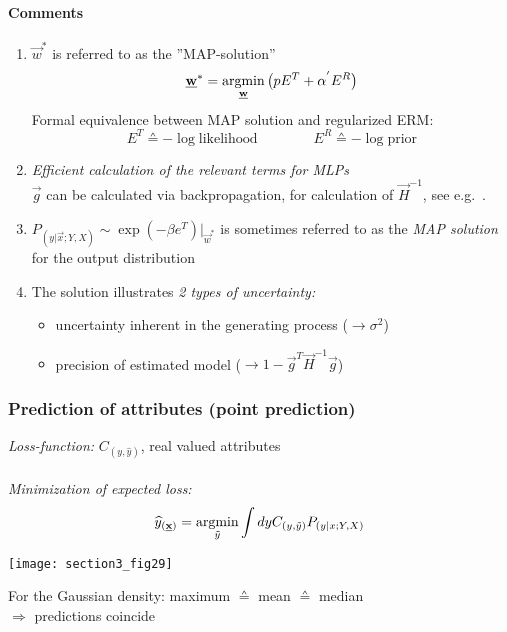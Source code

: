 \paragraph{Comments} 
\begin{enumerate}[(1)]
\item $\vec{w}^*$ is referred to as the ''MAP-solution'' \\
\begin{equation}
	\vec{w}^* = \argmin\limits_{\vec{w}} \big( p E^T + \alpha^{'} E^R \big)
\end{equation}
Formal equivalence between MAP solution and regularized ERM:
\begin{equation}
	E^T  \corresponds- \log \mathrm{likelihood} \qquad \qquad
	E^R  \corresponds - \log \mathrm{prior}
\end{equation}
\item \emph{Efficient calculation of the relevant terms for MLPs}\\
  $\vec{g}$ can be calculated via backpropagation, for calculation of
  $\vec{H}^{-1}$, see e.g.\ \textcite[ch.\ 5.4]{Bishop2006}.
\item $P_{(y|\vec{x};Y,X)} \sim \exp (-\beta e^T) \big|_{\vec{w}^*}$
  is sometimes referred to as the \emph{MAP solution} for the output
  distribution

\item The solution illustrates \emph{2 types of uncertainty:} 
  \begin{itemize}
  \item uncertainty inherent in the generating process ($\rightarrow \sigma^2$)
  \item precision of estimated model ($\rightarrow 1 - \vec{g}^T \vec{H}^{-1} \vec{g}$)
  \end{itemize}
\end{enumerate}

\subsubsection{Prediction of attributes (point prediction)}
\emph{Loss-function:} $C_{(y, \widehat{y})}$, real valued attributes
\\\\
\emph{Minimization of expected loss:}
\begin{equation}
	\widehat{y}_{(\vec{x})} = \argmin\limits_{\tilde{y}}
	\int dy C_{(y, \tilde{y})} P_{(y|x;Y,X)}
\end{equation}
\begin{center}
\texttt{[image: section3\_fig29]} 
\end{center}
For the Gaussian density: maximum $\corresponds$ mean $\corresponds$ median\\
$\Rightarrow$ predictions coincide


